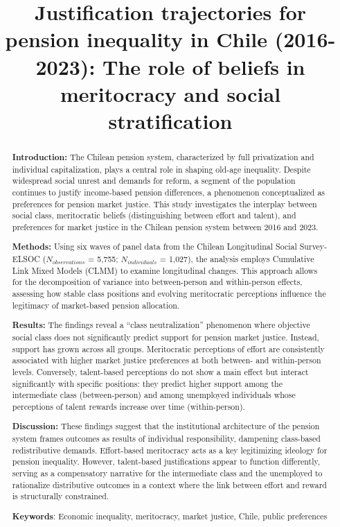 \documentclass[
  12pt,
]{article}
\title{Justification trajectories for pension inequality in Chile
(2016-2023): The role of beliefs in meritocracy and social
stratification}
\author{}
\date{}  %
\begin{document}
\maketitle
\begin{abstract}
\textbf{Introduction:} The Chilean pension system, characterized by full
privatization and individual capitalization, plays a central role in
shaping old-age inequality. Despite widespread social unrest and demands
for reform, a segment of the population continues to justify
income-based pension differences, a phenomenon conceptualized as
preferences for pension market justice. This study investigates the
interplay between social class, meritocratic beliefs (distinguishing
between effort and talent), and preferences for market justice in the
Chilean pension system between 2016 and 2023.

\textbf{Methods:} Using six waves of panel data from the Chilean
Longitudinal Social Survey-ELSOC (\(N_{observations}\) = 5,755;
\(N_{individuals}\) = 1,027), the analysis employs Cumulative Link Mixed
Models (CLMM) to examine longitudinal changes. This approach allows for
the decomposition of variance into between-person and within-person
effects, assessing how stable class positions and evolving meritocratic
perceptions influence the legitimacy of market-based pension allocation.

\textbf{Results:} The findings reveal a ``class neutralization''
phenomenon where objective social class does not significantly predict
support for pension market justice. Instead, support has grown across
all groups. Meritocratic perceptions of effort are consistently
associated with higher market justice preferences at both between- and
within-person levels. Conversely, talent-based perceptions do not show a
main effect but interact significantly with specific positions: they
predict higher support among the intermediate class (between-person) and
among unemployed individuals whose perceptions of talent rewards
increase over time (within-person).

\textbf{Discussion:} These findings suggest that the institutional
architecture of the pension system frames outcomes as results of
individual responsibility, dampening class-based redistributive demands.
Effort-based meritocracy acts as a key legitimizing ideology for pension
inequality. However, talent-based justifications appear to function
differently, serving as a compensatory narrative for the intermediate
class and the unemployed to rationalize distributive outcomes in a
context where the link between effort and reward is structurally
constrained.

\textbf{Keywords}: Economic inequality, meritocracy, market justice,
Chile, public preferences
\end{abstract}
\end{document}
